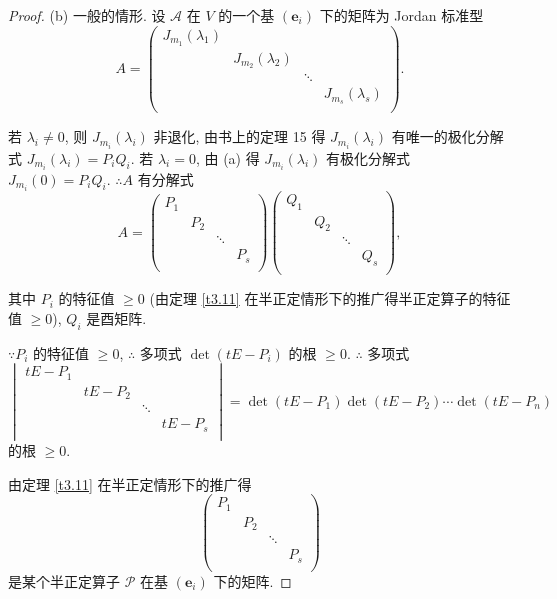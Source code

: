 \documentclass[color=black,device=normal,lang=cn,mode=geye]{elegantnote}
\begin{document}
\begin{proof}
    (b) 一般的情形. 设 $\mathcal{A}$ 在 $V$ 的一个基 $(\boldsymbol{e}_i)$ 下的矩阵为 Jordan 标准型
    \[A=\begin{pmatrix}
        J_{m_1}(\lambda_1) \\
        & J_{m_2}(\lambda_2) \\
        && \ddots \\
        &&& J_{m_s}(\lambda_s) \\
    \end{pmatrix}.\]

    若 $\lambda_i\neq0$, 则 $J_{m_i}(\lambda_i)$ 非退化, 由书上的定理 15 得 $J_{m_i}(\lambda_i)$ 有唯一的极化分解式 $J_{m_i}(\lambda_i)=P_iQ_i$. 若 $\lambda_i=0$, 由 (a) 得 $J_{m_i}(\lambda_i)$ 有极化分解式 $J_{m_i}(0)=P_iQ_i$. $\therefore A$ 有分解式
    \begin{equation}\label{eq3.6}
        A=\begin{pmatrix}
            P_1 \\
            & P_2 \\
            && \ddots \\
            &&& P_s \\
        \end{pmatrix}\begin{pmatrix}
            Q_1 \\
            & Q_2 \\
            && \ddots \\
            &&& Q_s \\
        \end{pmatrix},
    \end{equation}

    其中 $P_i$ 的特征值 $\geq0$ (由定理 \ref{t3.11} 在半正定情形下的推广得半正定算子的特征值 $\geq0$), $Q_i$ 是酉矩阵.

    $\because P_i$ 的特征值 $\geq0$, $\therefore$ 多项式 $\det(tE-P_i)$ 的根 $\geq0$. $\therefore$ 多项式
    \[\begin{vmatrix}
        tE-P_1 \\
        & tE-P_2 \\
        && \ddots \\
        &&& tE-P_s \\
    \end{vmatrix}=\det(tE-P_1)\det(tE-P_2)\cdots\det(tE-P_n)\]
    的根 $\geq0$.

    由定理 \ref{t3.11} 在半正定情形下的推广得
    \[\begin{pmatrix}
        P_1 \\
        & P_2 \\
        && \ddots \\
        &&& P_s \\
    \end{pmatrix}\]
    是某个半正定算子 $\mathcal{P}$ 在基 $(\boldsymbol{e}_i)$ 下的矩阵.


\end{proof}
\end{document}
